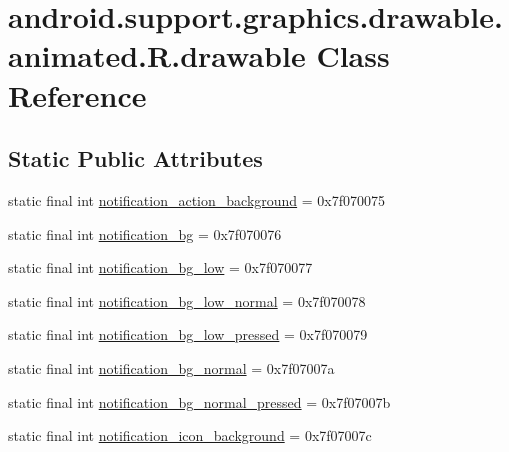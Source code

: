 \hypertarget{classandroid_1_1support_1_1graphics_1_1drawable_1_1animated_1_1_r_1_1drawable}{}\section{android.\+support.\+graphics.\+drawable.\+animated.\+R.\+drawable Class Reference}
\label{classandroid_1_1support_1_1graphics_1_1drawable_1_1animated_1_1_r_1_1drawable}
\subsection*{Static Public Attributes}
\begin{DoxyCompactItemize}
\item 
static final int \mbox{\hyperlink{classandroid_1_1support_1_1graphics_1_1drawable_1_1animated_1_1_r_1_1drawable_a11bf3dd87b85eec07b682350dce74f85}{notification\+\_\+action\+\_\+background}} = 0x7f070075
\item 
static final int \mbox{\hyperlink{classandroid_1_1support_1_1graphics_1_1drawable_1_1animated_1_1_r_1_1drawable_a867e41930939ea97edaed48e8c3f9677}{notification\+\_\+bg}} = 0x7f070076
\item 
static final int \mbox{\hyperlink{classandroid_1_1support_1_1graphics_1_1drawable_1_1animated_1_1_r_1_1drawable_ae36224aa069ed404237d9d5ec69a6d24}{notification\+\_\+bg\+\_\+low}} = 0x7f070077
\item 
static final int \mbox{\hyperlink{classandroid_1_1support_1_1graphics_1_1drawable_1_1animated_1_1_r_1_1drawable_a9da9694ce9c699c8014efb3291936fa8}{notification\+\_\+bg\+\_\+low\+\_\+normal}} = 0x7f070078
\item 
static final int \mbox{\hyperlink{classandroid_1_1support_1_1graphics_1_1drawable_1_1animated_1_1_r_1_1drawable_ae6eb1de4089432615613842d9321c3ac}{notification\+\_\+bg\+\_\+low\+\_\+pressed}} = 0x7f070079
\item 
static final int \mbox{\hyperlink{classandroid_1_1support_1_1graphics_1_1drawable_1_1animated_1_1_r_1_1drawable_a386dcd24ded6a7299fee657aceb353ba}{notification\+\_\+bg\+\_\+normal}} = 0x7f07007a
\item 
static final int \mbox{\hyperlink{classandroid_1_1support_1_1graphics_1_1drawable_1_1animated_1_1_r_1_1drawable_a863b5c208c30d1d07332657c216a2af2}{notification\+\_\+bg\+\_\+normal\+\_\+pressed}} = 0x7f07007b
\item 
static final int \mbox{\hyperlink{classandroid_1_1support_1_1graphics_1_1drawable_1_1animated_1_1_r_1_1drawable_a22985c9b80fbf6074397962a880837b7}{notification\+\_\+icon\+\_\+background}} = 0x7f07007c

\end{DoxyCompactItemize}
